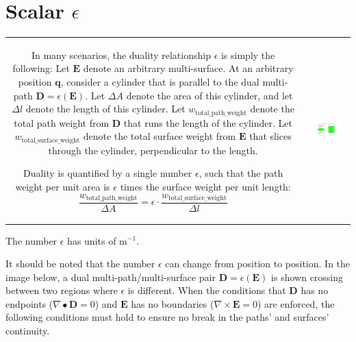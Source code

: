 \section{Scalar $\epsilon$}\label{sec:scalar_epsilon}

\begin{tabular}{cc}
\parbox{0.5\textwidth}{
In many scenarios, the duality relationship \(\epsilon\) is simply the following: Let \(\mathbf{E}\) denote an arbitrary multi-surface. At an arbitrary position \(\mathbf{q}\), consider a cylinder that is parallel to the dual multi-path \(\mathbf{D} = \epsilon(\mathbf{E})\). Let \(\Delta A\) denote the area of this cylinder, and let \(\Delta l\) denote the length of this cylinder. Let \(w_{\text{total\_path\_weight}}\) denote the total path weight from \(\mathbf{D}\) that runs the length of the cylinder. Let \(w_{\text{total\_surface\_weight}}\) denote the total surface weight from \(\mathbf{E}\) that slices through the cylinder, perpendicular to the length. 

Duality is quantified by a single number \(\epsilon\), such that the path weight per unit area is \(\epsilon\) times the surface weight per unit length: 
\[\frac{w_{\text{total\_path\_weight}}}{\Delta A} = \epsilon \cdot \frac{w_{\text{total\_surface\_weight}}}{\Delta l}\]
} & \parbox{0.5\textwidth}{
\includegraphics[width = 0.5\textwidth]{Duality/scalar_epsilon}
}
\end{tabular}

The number \(\epsilon\) has units of \(\text{m}^{-1}\).

It should be noted that the number \(\epsilon\) can change from position to position. In the image below, a dual multi-path/multi-surface pair \(\mathbf{D} = \epsilon(\mathbf{E})\) is shown crossing between two regions where \(\epsilon\) is different. When the conditions that \(\mathbf{D}\) has no endpoints (\(\nabla \bullet \mathbf{D} = 0\)) and \(\mathbf{E}\) has no boundaries (\(\nabla \times \mathbf{E} = 0\)) are enforced, the following conditions must hold to ensure no break in the paths' and surfaces' continuity. 


